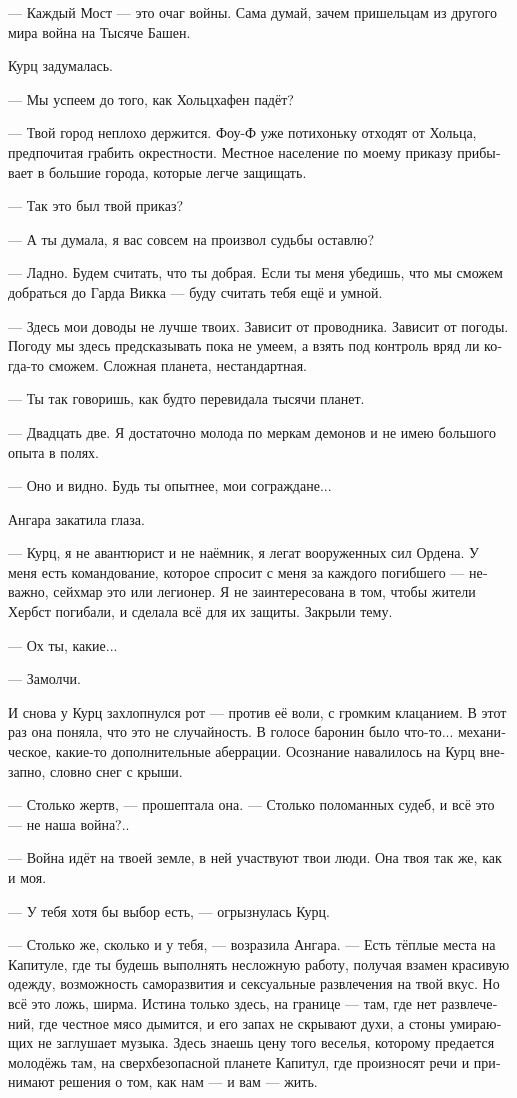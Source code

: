 \documentclass[a4paper,12pt,fleqn]{book}\usepackage{cooltooltips}\usepackage{polyglossia}\setdefaultlanguage[babelshorthands=true]{russian}\setotherlanguage{english}\defaultfontfeatures{Ligatures=TeX,Mapping=tex-text} \usepackage{xcolor}\definecolor{lightgray}{HTML}{bbbbbb}\color{lightgray}\newcommand{\ml}[3]{\textenglish{\textcolor{black}{#3}}}
\begin{document}
--- Каждый Мост --- это очаг войны.
Сама думай, зачем пришельцам из другого мира война на Тысяче Башен.

Курц задумалась.

--- Мы успеем до того, как Хольцхафен падёт?

--- Твой город неплохо держится.
Фоу-Ф уже потихоньку отходят от Хольца, предпочитая грабить окрестности.
Местное население по моему приказу прибывает в большие города, которые легче защищать.

--- Так это был твой приказ?

--- А ты думала, я вас совсем на произвол судьбы оставлю?

--- Ладно.
Будем считать, что ты добрая.
Если ты меня убедишь, что мы сможем добраться до Гарда Викка --- буду считать тебя ещё и умной.

--- Здесь мои доводы не лучше твоих.
Зависит от проводника.
Зависит от погоды.
Погоду мы здесь предсказывать пока не умеем, а взять под контроль вряд ли когда-то сможем.
Сложная планета, нестандартная.

--- Ты так говоришь, как будто перевидала тысячи планет.

--- Двадцать две.
Я достаточно молода по меркам демонов и не имею большого опыта в полях.

--- Оно и видно.
Будь ты опытнее, мои сограждане...

Ангара закатила глаза.

--- Курц, я не авантюрист и не наёмник, я легат вооруженных сил Ордена.
У меня есть командование, которое спросит с меня за каждого погибшего --- неважно, сейхмар это или легионер.
Я не заинтересована в том, чтобы жители Хербст погибали, и сделала всё для их защиты.
Закрыли тему.

--- Ох ты, какие...

--- Замолчи.

И снова у Курц захлопнулся рот --- против её воли, с громким клацанием.
В этот раз она поняла, что это не случайность.
В голосе баронин было что-то... механическое, какие-то дополнительные аберрации.
Осознание навалилось на Курц внезапно, словно снег с крыши.

--- Столько жертв, --- прошептала она.
--- Столько поломанных судеб, и всё это --- не наша война?..

--- Война идёт на твоей земле, в ней участвуют твои люди.
Она твоя так же, как и моя.

--- У тебя хотя бы выбор есть, --- огрызнулась Курц.

--- Столько же, сколько и у тебя, --- возразила Ангара.
--- Есть тёплые места на Капитуле, где ты будешь выполнять несложную работу, получая взамен красивую одежду, возможность саморазвития и сексуальные развлечения на твой вкус.
Но всё это ложь, ширма.
Истина только здесь, на границе --- там, где нет развлечений, где честное мясо дымится, и его запах не скрывают духи, а стоны умирающих не заглушает музыка.
Здесь знаешь цену того веселья, которому предается молодёжь там, на сверхбезопасной планете Капитул, где произносят речи и принимают решения о том, как нам --- и вам --- жить.
\end{document}
